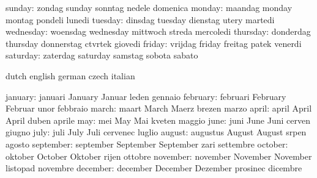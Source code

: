                    sunday: zondag                    sunday
                           sonntag                   nedele
                           domenica
                   monday: maandag                   monday
                           montag                    pondeli
                           lunedi
                  tuesday: dinsdag                   tuesday
                           dienstag                  utery
                           martedi
                wednesday: woensdag                  wednesday
                           mittwoch                  streda
                           mercoledi
                 thursday: donderdag                 thursday
                           donnerstag                ctvrtek
                           giovedi
                   friday: vrijdag                   friday
                           freitag                   patek
                           venerdi
                 saturday: zaterdag                  saturday
                           samstag                   sobota
                           sabato
\stopvariables

\startvariables            dutch                     english
                           german                    czech
                           italian

                  january: januari                   January
                           Januar                    leden
                           gennaio
                 february: februari                  February
                           Februar                   unor
                           febbraio
                    march: maart                     March
                           Maerz                     brezen
                           marzo
                    april: april                     April
                           April                     duben
                           aprile
                      may: mei                       May
                           Mai                       kveten
                           maggio
                     june: juni                      June
                           Juni                      cerven
                           giugno
                     july: juli                      July
                           Juli                      cervenec
                           luglio
                   august: augustus                  August
                           August                    srpen
                           agosto
                september: september                 September
                           September                 zari
                           settembre
                  october: oktober                   October
                           Oktober                   rijen
                           ottobre
                 november: november                  November
                           November                  listopad
                           novembre
                 december: december                  December
                           Dezember                  prosinec
                           dicembre
\stopvariables

